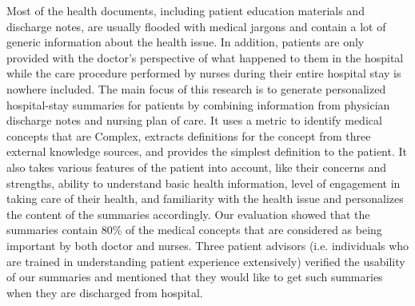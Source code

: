 Most of the health documents, including patient education materials and discharge notes, are usually flooded with medical jargons and contain a lot of generic information about the health issue. In addition, patients are only provided with the doctor's perspective of what happened to them in the hospital while the care procedure performed by nurses during their entire hospital stay is nowhere included. The main focus of this research is to generate personalized hospital-stay summaries for patients by combining information from physician discharge notes and nursing plan of care. It uses a metric to identify medical concepts that are Complex, extracts definitions for the concept from three external knowledge sources, and provides the simplest definition to the patient. It also takes various features of the patient into account, like their concerns and strengths, ability to understand basic health information, level of engagement in taking care of their health, and familiarity with the health issue and personalizes the content of the summaries accordingly. Our evaluation showed that the summaries contain 80\% of the medical concepts that are considered as being important by both doctor and nurses. Three patient advisors (i.e. individuals who are trained in understanding patient experience extensively) verified the usability of our summaries and mentioned that they would like to get such summaries when they are discharged from hospital.
